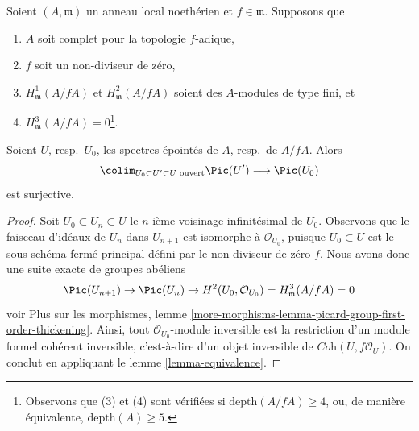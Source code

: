 \begin{lemma}
\label{lemma-surjective-Pic-first}
Soient $(A, \mathfrak m)$ un anneau local noethérien et $f \in \mathfrak m$.
Supposons que
\begin{enumerate}
\item $A$ soit complet pour la topologie $f$-adique,
\item $f$ soit un non-diviseur de zéro,
\item $H^1_\mathfrak m(A/fA)$ et $H^2_\mathfrak m(A/fA)$
soient des $A$-modules de type fini, et
\item $H^3_\mathfrak m(A/fA) = 0$\footnote{Observons que (3) et (4) sont vérifiées
si $\text{depth}(A/fA) \geq 4$, ou, de manière équivalente, $\text{depth}(A) \geq 5$.}.
\end{enumerate}
Soient $U$, resp.\ $U_0$, les spectres épointés de $A$, resp.\ de $A/fA$.
Alors
$$
\colim_{U_0 \subset U' \subset U\text{ ouvert}} \Pic(U')
\longrightarrow
\Pic(U_0)
$$
est surjective.
\end{lemma}

\begin{proof}
Soit $U_0 \subset U_n \subset U$ le $n$-ième voisinage infinitésimal
de $U_0$. Observons que le faisceau d'idéaux de $U_n$ dans $U_{n + 1}$ est
isomorphe à $\mathcal{O}_{U_0}$, puisque $U_0 \subset U$ est le sous-schéma
fermé principal défini par le non-diviseur de zéro $f$. Nous avons donc
une suite exacte de groupes abéliens
$$
\Pic(U_{n + 1}) \to \Pic(U_n) \to
H^2(U_0, \mathcal{O}_{U_0}) = H^3_\mathfrak m(A/fA) = 0
$$
voir Plus sur les morphismes, lemme
\ref{more-morphisms-lemma-picard-group-first-order-thickening}.
Ainsi, tout $\mathcal{O}_{U_0}$-module inversible est la restriction
d'un module formel cohérent inversible, c'est-à-dire d'un objet inversible de
$\textit{Coh}(U, f\mathcal{O}_U)$. On conclut en appliquant le
lemme \ref{lemma-equivalence}.
\end{proof}

